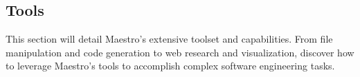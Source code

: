 \subsection*{Tools}

This section will detail Maestro's extensive toolset and capabilities. From file manipulation and code generation to web research and visualization, discover how to leverage Maestro's tools to accomplish complex software engineering tasks.